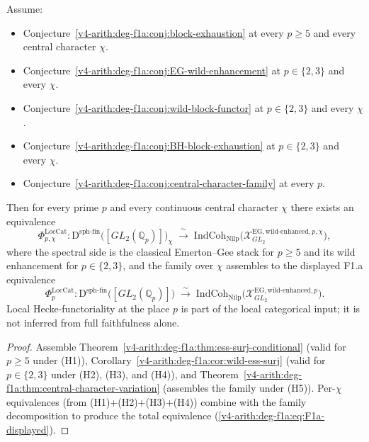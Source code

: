 \begin{theorem}
\label{v4-arith:deg-f1a:thm:F1a-conditional}
Assume:
\begin{itemize}
\item[\textbf{(H1)}] Conjecture~\ref{v4-arith:deg-f1a:conj:block-exhaustion}
at every \(p\geq 5\) and every central character \(\chi\).
\item[\textbf{(H2)}] Conjecture~\ref{v4-arith:deg-f1a:conj:EG-wild-enhancement}
at \(p\in\{2,3\}\) and every \(\chi\).
\item[\textbf{(H3)}] Conjecture~\ref{v4-arith:deg-f1a:conj:wild-block-functor}
at \(p\in\{2,3\}\) and every \(\chi\).
\item[\textbf{(H4)}] Conjecture~\ref{v4-arith:deg-f1a:conj:BH-block-exhaustion}
at \(p\in\{2,3\}\) and every \(\chi\).
\item[\textbf{(H5)}] Conjecture~\ref{v4-arith:deg-f1a:conj:central-character-family}
at every \(p\).
\end{itemize}
Then for every prime \(p\) and every continuous central character
\(\chi\) there exists an equivalence
\begin{equation}
\label{v4-arith:deg-f1a:eq:F1a-conditional}
\Phi^{\mathrm{LocCat}}_{p,\chi}\colon\mathrm{D}^{\mathrm{sph\text{-}fin}}\bigl([GL_{2}(\mathbb{Q}_{p})]\bigr)_{\chi}
\;\xrightarrow{\;\sim\;}\;\mathrm{IndCoh}_{\mathrm{Nilp}}\bigl(\mathcal{X}^{\mathrm{EG,wild\text{-}enhanced},p,\chi}_{GL_{2}}\bigr),
\end{equation}
where the spectral side is the classical Emerton--Gee stack for
\(p\geq 5\) and its wild enhancement for \(p\in\{2,3\}\), and the
family over \(\chi\) assembles to the displayed F1.a equivalence
\begin{equation}
\label{v4-arith:deg-f1a:eq:F1a-displayed}
\Phi^{\mathrm{LocCat}}_{p}\colon\mathrm{D}^{\mathrm{sph\text{-}fin}}\bigl([GL_{2}(\mathbb{Q}_{p})]\bigr)
\;\xrightarrow{\;\sim\;}\;\mathrm{IndCoh}_{\mathrm{Nilp}}\bigl(\mathcal{X}^{\mathrm{EG,wild\text{-}enhanced},p}_{GL_{2}}\bigr).
\end{equation}
Local Hecke-functoriality at the place \(p\) is part of the local
categorical input; it is not inferred from full faithfulness alone.
\end{theorem}

\begin{proof}
Assemble Theorem~\ref{v4-arith:deg-f1a:thm:ess-surj-conditional} (valid
for \(p\geq 5\) under (H1)),
Corollary~\ref{v4-arith:deg-f1a:cor:wild-ess-surj} (valid for \(p\in\{2,3\}\)
under (H2), (H3), and (H4)), and
Theorem~\ref{v4-arith:deg-f1a:thm:central-character-variation}
(assembles the family under (H5)).
Per-\(\chi\) equivalences (from (H1)+(H2)+(H3)+(H4)) combine with the
family decomposition to produce the total equivalence
(\ref{v4-arith:deg-f1a:eq:F1a-displayed}).
\end{proof}

